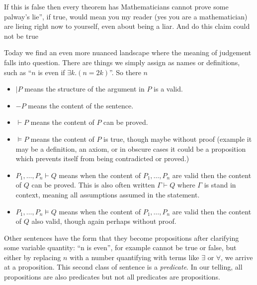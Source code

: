     

If this is false then every theorem has 
Mathematicians cannot prove some palway's lie'', if true, would mean you my reader
(yes you are a mathematician) are lieing right now to yourself, even about 
being a liar.  And do this claim could not be true


Today we find an even more nuanced landscape where the meaning of judgement 
falls into question.  There are things we simply assign as names or 
definitions, such as ``$n$ is even if $\exists k.(n=2k)$''.  So 
there $n$




\begin{itemize}
    \item $|P$ means the structure of the argument in $P$ is a valid.
    \item $-P$ means the content of the sentence.
    \item $\vdash P$ means the content of $P$ can be proved.
    \item $\vDash P$ means the content of $P$ is true, though maybe without proof
    (example it may be a definition, an axiom, or in obscure cases 
    it could be a proposition which prevents itself from being contradicted 
    or proved.)

    \item $P_1,\ldots,P_n \vdash Q$ means when the content of $P_1,\ldots,P_n$ are valid 
    then the content of $Q$ can be proved.  This is also often written 
    $\Gamma \vdash Q$ where $\Gamma$ is stand in context, meaning all 
    assumptions assumed in the statement.
    \item $P_1,\ldots,P_n \vDash Q$ means when the content of $P_1,\ldots,P_n$ are valid 
    then the content of $Q$ also valid, though again perhaps without proof.
\end{itemize}


Other sentences have the form that they become propositions after clarifying
some variable quantity: ``n is even'', for example cannot be true or false, but
either by replacing $n$ with a number quantifying with terms like $\exists$ or 
$\forall$, we arrive at a proposition.  This second class of sentence is a
\emph{predicate}. In our telling, all propositions are also
predicates but not all predicates are propositions.

